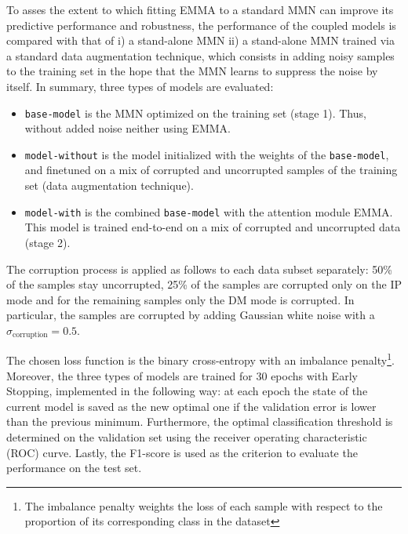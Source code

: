 To asses the extent to which fitting EMMA to a standard MMN can improve its predictive performance and robustness, the performance of the coupled models is compared with that of i) a stand-alone MMN ii) a stand-alone MMN trained via a standard data augmentation technique, which consists in adding noisy samples to the training set in the hope that the MMN learns to suppress the noise by itself. In summary, three types of models are evaluated:
\begin{itemize}
\item \texttt{base-model} is the MMN optimized on the training set (stage 1). Thus, without added noise neither using EMMA.
\item \texttt{model-without} is the model initialized with the weights of the \texttt{base-model}, and finetuned on a mix of corrupted and uncorrupted samples of the training set (data augmentation technique).
\item \texttt{model-with} is the combined \texttt{base-model} with the attention module EMMA. This model is trained end-to-end on a mix of corrupted and uncorrupted data (stage 2). 
\end{itemize}
The corruption process is applied as follows to each data subset separately: 50\% of the samples stay uncorrupted, 25\% of the samples are corrupted only on the IP mode and for the remaining samples only the DM mode is corrupted. In particular, the samples are corrupted by adding Gaussian white noise with a $\sigma_{\text{corruption}} = 0.5$.

The chosen loss function is the binary cross-entropy with an imbalance penalty\footnote{The imbalance penalty weights the loss of each sample with respect to the proportion of its corresponding class in the dataset}. Moreover, the three types of models are trained for 30 epochs with Early Stopping, implemented in the following way: at each epoch the state of the current model is saved as the new optimal one if the validation  error is lower than the previous minimum. Furthermore, the optimal classification threshold is determined on the validation set using the receiver operating characteristic (ROC) curve. Lastly, the F1-score is used as the criterion to evaluate the performance on the test set. 

